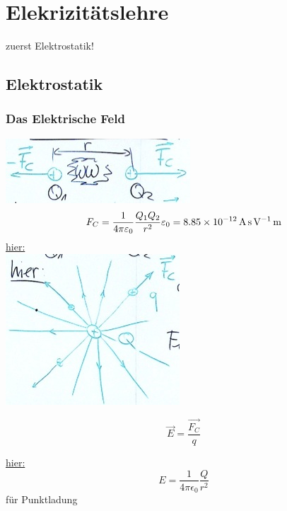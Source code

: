 \chapter{Elekrizitätslehre}
zuerst Elektrostatik!

\section{Elektrostatik}
\subsection{Das Elektrische Feld}
\includegraphics{Bild147} \\
\[
	F_C = \frac{1}{4 \pi \varepsilon_0} \frac{Q_1 Q_2}{r^2} \\
	\varepsilon_0 = \SI{8.85E-12}{\ampere\second\per\volt\metre}
\]
\uline{hier:} \\
\includegraphics{Bild148}
\begin{def*}[ note = elektrische Feld , index = elektrische Feld , indexformat = {1!~2 2!1~} ]
	\[ \boxed{ \vec{E} = \frac{\vec{F_C}}{q} } \]
\end{def*}
\uline{hier:}
\[ E = \frac{1}{4 \pi \epsilon_0} \frac{Q}{r^2} \]
für Punktladung

